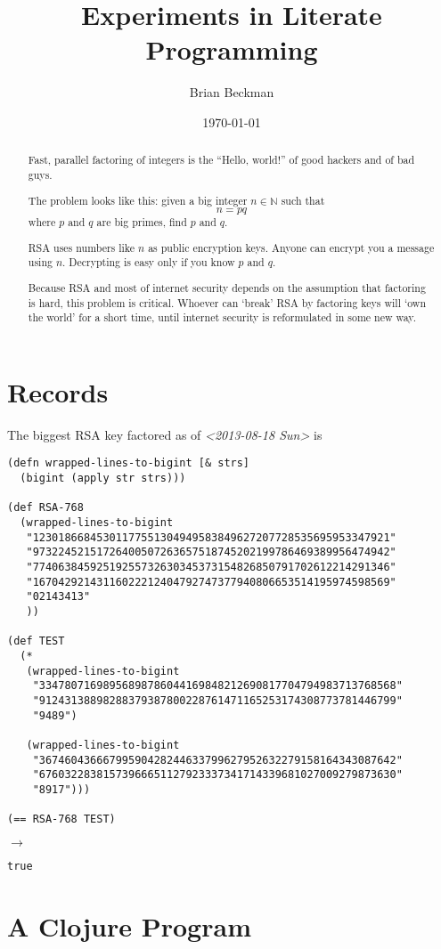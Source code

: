 \documentclass[11pt]{article}
\author{Brian Beckman}
\date{\today}
\title{Experiments in Literate Programming}
\begin{document}
\maketitle
\tableofcontents

\begin{abstract}
Fast, parallel factoring of integers is the ``Hello, world!''
of good hackers and of bad guys.

The problem looks like this: given a big integer $n\in\mathbb{N}$ such
 that \[n = p q\] where $p$ and $q$
are big primes, find $p$ and $q$.

RSA uses numbers like $n$ as public encryption
keys. Anyone can encrypt you a message using $n$.
Decrypting is easy only if you know $p$ and $q$.

Because RSA and most of
internet security depends on the assumption that factoring is
hard, this problem is critical. Whoever can
`break' RSA by factoring keys will `own the world' for a short time,
until internet security is reformulated in some new way.
\end{abstract}

\section{Records}
\label{sec-1}
The biggest RSA key factored as of \textit{<2013-08-18 Sun>} is
\begin{verbatim}
(defn wrapped-lines-to-bigint [& strs]
  (bigint (apply str strs)))

(def RSA-768
  (wrapped-lines-to-bigint
   "12301866845301177551304949583849627207728535695953347921"
   "97322452151726400507263657518745202199786469389956474942"
   "77406384592519255732630345373154826850791702612214291346"
   "16704292143116022212404792747377940806653514195974598569"
   "02143413"
   ))

(def TEST
  (*
   (wrapped-lines-to-bigint
    "33478071698956898786044169848212690817704794983713768568"
    "91243138898288379387800228761471165253174308773781446799"
    "9489")

   (wrapped-lines-to-bigint
    "36746043666799590428244633799627952632279158164343087642"
    "67603228381573966651127923337341714339681027009279873630"
    "8917")))

(== RSA-768 TEST)
\end{verbatim}
$\longrightarrow$
\begin{verbatim}
true
\end{verbatim}

\section{A Clojure Program}
\label{sec-2}
\end{document}
